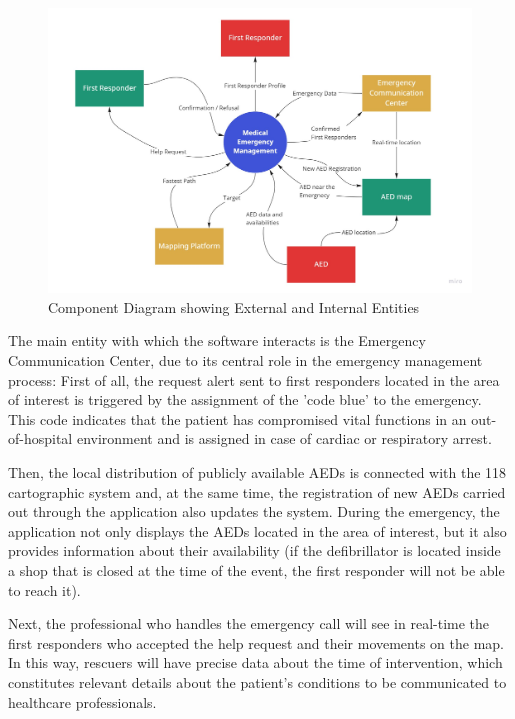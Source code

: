 \documentclass[11pt,a4paper]{article}
\begin{document}
\begin{figure}
    \centering
    \includegraphics[width=\textwidth]{images/context.jpg}
    \caption{Component Diagram showing External and Internal Entities}
    \label{fig:context}
\end{figure}

The main entity with which the software interacts is the Emergency Communication Center, due to its central role in the emergency management process:
%
First of all, the request alert sent to first responders located in the area of interest is triggered by the assignment of the 'code blue' to the emergency.
%
This code indicates that the patient has compromised vital functions in an out-of-hospital environment and is assigned in case of cardiac or respiratory arrest.

Then, the local distribution of publicly available AEDs is connected with the 118 cartographic system and, at the same time, the registration of new AEDs carried out through the application also updates the system. 
%
During the emergency, the application not only displays the AEDs located in the area of interest, but it also provides information about their availability (if the defibrillator is located inside a shop that is closed at the time of the event, the first responder will not be able to reach it).

Next, the professional who handles the emergency call will see in real-time the first responders who accepted the help request and their movements on the map.
%
In this way, rescuers will have precise data about the time of intervention, which constitutes relevant details about the patient's conditions to be communicated to healthcare professionals.
\end{document}
